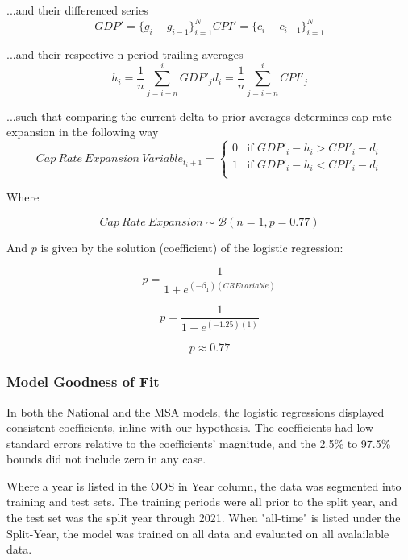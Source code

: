 \documentclass[jrfm,article,submit,oneauthor,pdftex]{Definitions/mdpi}
\begin{document}
...and their differenced series
\begin{equation}
GDP' = \{g_i-g_{i-1}\}_{i=1}^N 
CPI' = \{c_i-c_{i-1}\}_{i=1}^N 
\end{equation}

...and their respective n-period trailing averages
\begin{equation}
h_i=\frac{1}{n} \sum_{j=i-n}^{i}GDP'_j
d_i=\frac{1}{n} \sum_{j=i-n}^{i}CPI'_j
\end{equation}

...such that comparing the current delta to prior averages determines cap rate expansion in the following way
\begin{equation}
  Cap\: Rate\:Expansion\:Variable_{t_i+1} =
  \begin{cases}
    0 & \text{if $GDP'_i-h_i > CPI'_i-d_i $} \\
    1 & \text{if $GDP'_i-h_i < CPI'_i-d_i $} \\
  \end{cases}
\end{equation}

Where 

\begin{equation}
  Cap\:Rate\:Expansion \sim \mathcal{B}(n=1,p=0.77)  
\end{equation}

And $p$ is given by the solution (coefficient) of the logistic regression:

\begin{equation}
p=\frac{1}{1+e^{(-\beta_1)(CRE variable)}}
\end{equation}

\begin{equation}
p=\frac{1}{1+e^{(-1.25)(1)}}
\end{equation}

\begin{equation}
p \approx 0.77
\end{equation}

\subsubsection{Model Goodness of Fit}

In both the National and the MSA models, the logistic regressions displayed consistent coefficients, inline with our hypothesis. The coefficients had low standard errors relative  to the coefficients' magnitude, and the 2.5\% to 97.5\% bounds did not include zero in any case. 

Where a year is listed in the OOS in Year column, the data was segmented into training and test sets. The training periods were all prior to the split year, and the test set was the split year through 2021. When "all-time" is listed under the Split-Year, the model was trained on all data and evaluated on all avalailable data. 
\end{document}
